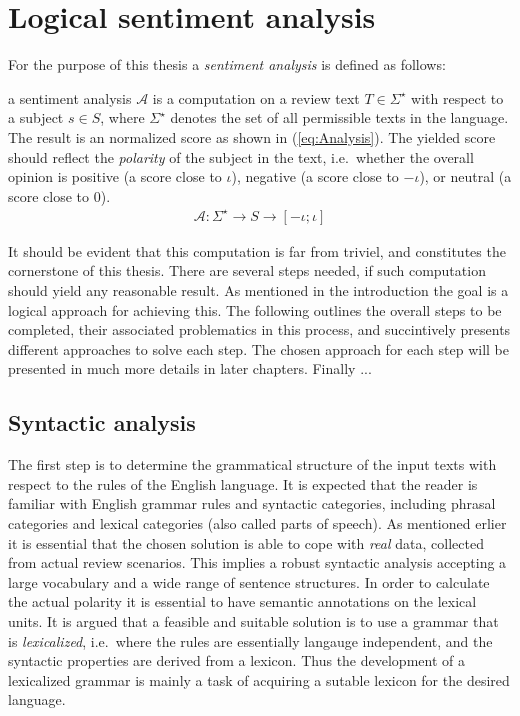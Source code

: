
\chapter{Logical sentiment analysis}

For the purpose of this thesis a \emph{sentiment analysis} is defined as follows:
\begin{definition}
a sentiment analysis $\mathcal{A}$ is a computation on a review text $T \in \Sigma^\star$ with respect to a subject $s \in S$, where $\Sigma^\star$ denotes the set of all permissible texts in the language. The result is an normalized score as shown in (\ref{eq:Analysis}). The yielded score should reflect the \emph{polarity} of the subject in the text, i.e.\ whether the overall opinion is positive (a score close to $\iota$), negative (a score close to $-\iota$), or neutral (a score close to $0$).
  \begin{align}
	 \mathcal{A}: \Sigma^\star \to S \to [-\iota;\iota]
	 \label{eq:Analysis}
  \end{align}
\end{definition}

 It should be evident that this computation is far from triviel, and constitutes the cornerstone of this thesis. There are several steps needed, if such computation should yield any reasonable result. As mentioned in the introduction the goal is a logical approach for achieving this. The following outlines the overall steps to be completed, their associated problematics in this process, and succintively presents different approaches to solve each step. The chosen approach for each step will be presented in much more details in later chapters. Finally ... 

\clearpage

\section{Syntactic analysis}
The first step is to determine the grammatical structure of the input texts with respect to the rules of the English language. It is expected that the reader is familiar with English grammar rules and syntactic categories, including phrasal categories and lexical categories (also called parts of speech). As mentioned erlier it is essential that the chosen solution is able to cope with \emph{real} data, collected from actual review scenarios. This implies a robust syntactic analysis accepting a large vocabulary and a wide range of sentence structures. In order to calculate the actual polarity it is essential to have semantic annotations on the lexical units. It is argued that a feasible and suitable solution is to use a grammar that is \emph{lexicalized}, i.e.\ where the rules are essentially langauge independent, and the syntactic properties are derived from a lexicon. Thus the development of a lexicalized grammar is mainly a task of acquiring a sutable lexicon for the desired language.

